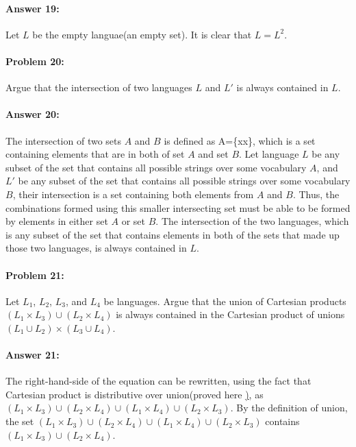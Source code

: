 \documentclass[10pt]{article}
\begin{document}
\paragraph{Answer 19:} Let $L$ be the empty languae(an empty set). It is clear that $L=L^2$.

\noindent\hrulefill %

\paragraph{Problem 20:}
Argue that the intersection of two languages $L$ and $L'$ is always
contained in $L$.

\paragraph{Answer 20:} The intersection of two sets $A$ and $B$ is defined as 
A\capB=\{x\given x\epsilonA\landx\epsilonB\}, which is a set containing elements that are in both of set $A$ and set $B$.
Let language $L$ be any subset of the set that contains all possible strings over some vocabulary $A$,  
and $L'$ be any subset of the set that contains all possible strings over some vocabulary $B$, 
their intersection is a set containing both elements from $A$ and $B$. Thus, the combinations formed using this smaller intersecting set
must be able to be formed by elements in either set $A$ or set $B$. The intersection of the two languages, which is any subset of the set that contains 
elements in both of the sets that made up those two languages, is always contained in $L$.
\noindent\hrulefill %

\paragraph{Problem 21:}
Let $L_1$, $L_2$, $L_3$, and $L_4$ be languages. Argue that the union
of Cartesian products $(L_1 \times L_3) \cup (L_2 \times L_4)$ is
always contained in the Cartesian product of unions
$(L_1 \cup L_2) \times (L_3 \cup L_4)$.

\paragraph{Answer 21:} The right-hand-side of the equation can be rewritten, using the fact that Cartesian product is distributive over union(proved here \href{https://proofwiki.org/wiki/Cartesian_Product_Distributes_over_Union}), as
$(L_1 \times L_3) \cup (L_2 \times L_4) \cup (L_1 \times L_4) \cup (L_2 \times L_3)$. By the definition of union, the set $(L_1 \times L_3) \cup (L_2 \times L_4) \cup (L_1 \times L_4) \cup (L_2 \times L_3)$ contains 
$(L_1 \times L_3) \cup (L_2 \times L_4)$. 
\end{document}
